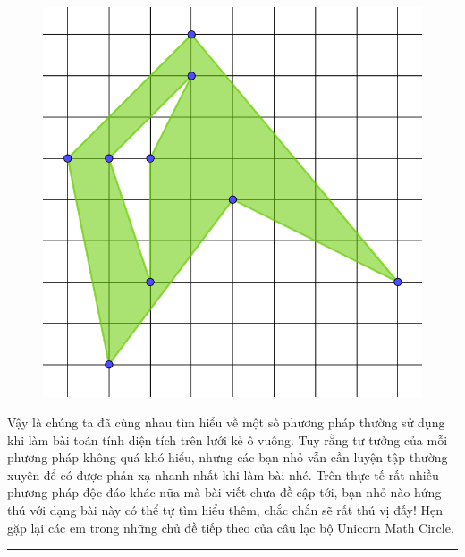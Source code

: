 \begin{multicols}{2}
\begin{figure}[H]
		\vspace*{-15pt}
	\end{figure}
\begin{figure}[H]
	\centering
	\vspace*{5pt}
	\captionsetup{labelformat= empty, justification=centering}
	\includegraphics[width=0.58\linewidth]{21}
	\vspace*{-10pt}
\end{figure}
	Vậy là chúng ta đã cùng nhau tìm hiểu về một số phương pháp thường sử dụng khi làm bài toán tính diện tích trên lưới kẻ ô vuông. Tuy rằng tư tưởng của mỗi phương pháp không quá khó hiểu, nhưng các bạn nhỏ vẫn cần luyện tập thường xuyên để có được phản xạ nhanh nhất khi làm bài nhé. Trên thực tế rất nhiều phương pháp độc đáo khác nữa mà bài viết chưa đề cập tới, bạn nhỏ nào hứng thú với dạng bài này có thể tự tìm hiểu thêm, chắc chắn sẽ rất thú vị đấy! Hẹn gặp lại các em trong những chủ đề tiếp theo của câu lạc bộ Unicorn Math Circle.
\end{multicols}
\vspace*{-10pt}
\rule{1\linewidth}{0.1pt}
\begingroup
